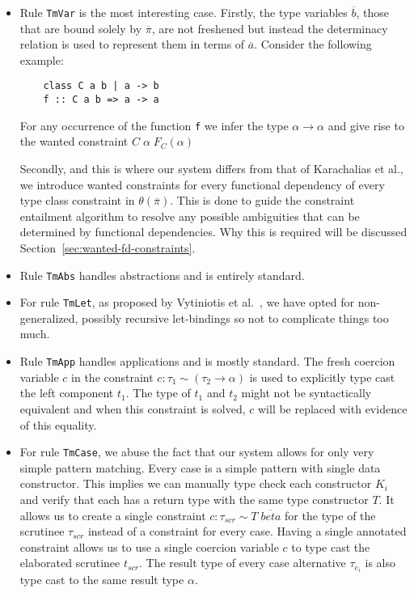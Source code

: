 \begin{itemize}

  \item Rule \texttt{TmVar} is the most interesting case. Firstly, the type variables
$\overline{b}$, those that are bound solely by $\overline{\pi}$, are not
freshened but instead the determinacy relation is used to represent them in
terms of $\overline{a}$. Consider the following example:
\begin{verbatim}
    class C a b | a -> b
    f :: C a b => a -> a
\end{verbatim}
For any occurrence of the function \texttt{f} we infer the type $\alpha
\rightarrow \alpha$ and give rise to the wanted constraint $C \; \alpha \;
F_C(\alpha)$

Secondly, and this is where our system differs from that of Karachalias et
al.\cite{Karachalias:2017:EFD:3156695.3122966}, we introduce wanted constraints
for every functional dependency of every type class constraint in
$\theta(\overline{\pi})$. This is done to guide the constraint entailment
algorithm to resolve any possible ambiguities that can be determined by
functional dependencies. Why this is required will be discussed
Section~\ref{sec:wanted-fd-constraints}.

\item Rule \texttt{TmAbs} handles abstractions and is entirely standard.

\item For rule \texttt{TmLet}, as proposed by Vytiniotis et
al.~\cite{vytiniotis}, we have opted for non-generalized, possibly recursive
let-bindings so not to complicate things too much.

\item Rule \texttt{TmApp} handles applications and is mostly standard. The fresh
coercion variable $c$ in the constraint $c : \tau_1 \sim (\tau_2 \rightarrow
\alpha)$ is used to explicitly type cast the left component $t_1$. The type of
$t_1$ and $t_2$ might not be syntactically equivalent and when this constraint is
solved, $c$ will be replaced with evidence of this equality.

\item For rule \texttt{TmCase}, we abuse the fact that our system allows for only very
simple pattern matching. Every case is a simple pattern with single data
constructor. This implies we can manually type check each constructor $K_i$ and
verify that each has a return type with the same type constructor $T$. It allows
us to create a single constraint $c : \tau_{scr} \sim T \; \overline{beta}$ for
the type of the scrutinee $\tau_{scr}$ instead of a constraint for every case.
Having a single annotated constraint allows us to use a single coercion variable
$c$ to type cast the elaborated scrutinee $t_{scr}$. The result type of every case
alternative $\tau_{e_i}$ is also type cast to the same result type $\alpha$.

\end{itemize}
